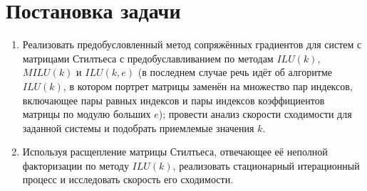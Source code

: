 \section{Постановка задачи}
\begin{enumerate}
	\item Реализовать предобусловленный метод сопряжённых градиентов для систем с матрицами Стилтьеса с предобуславливанием по методам $ILU(k)$, $MILU(k)$ и $ILU(k,e)$ (в последнем случае речь идёт об алгоритме $ILU(k)$, в котором портрет матрицы заменён на множество пар индексов, включающее пары равных индексов и пары индексов коэффициентов матрицы по модулю больших $e$); провести анализ скорости сходимости для заданной системы и подобрать приемлемые значения $k$.
	\item Используя расщепление матрицы Стилтьеса, отвечающее её неполной факторизации по методу $ILU(k)$, реализовать стационарный итерационный процесс и исследовать скорость его сходимости.
\end{enumerate}